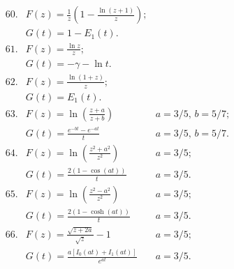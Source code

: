 \documentclass[10pt]{article}
\begin{document}
\[
\begin{array}{llr}
60. & F(z)= \frac{1}{z}\left (1-\frac{\ln (z+1)}{z}\right );& \\[1cm]
  & G(t)= 1- E_1(t).&\\[1cm]
61. & F(z)= \frac{\ln z}{z};& \\[1cm]
  & G(t)= -\gamma - \ln t.&\\[1cm]
62. & F(z)= \frac{\ln (1+z)}{z};& \\[1cm]
  & G(t)= E_1(t).&\\[1cm]
63. & F(z)= \ln \left ( \frac{z+a}{z+b}\right ) &a=3/5, \, b=5/7; \\[1cm]
  & G(t)= \frac{e^{-bt}-e^{-at}}{t}&a=3/5, \, b=5/7.\\[1cm]
64. & F(z)= \ln \left ( \frac{z^{2}+a^{2}}{z^{2}}\right )&a=3/5; \\[1cm]
  & G(t)= \frac{2(1-\cos(at))}{t}&a=3/5.\\[1cm]
65. & F(z)= \ln \left (\frac{z^{2}-a^{2}}{z^{2}}\right )&a=3/5; \\[1cm]
  & G(t)= \frac{2(1-\cosh(at))}{t}&a=3/5.\\[1cm]
66. & F(z)= \frac{\sqrt{z+2a}}{\sqrt{z}}-1&a=3/5; \\[1cm]
  & G(t)= \frac{a[I_0(at)+ I_1(at)]}{e^{at}}&a=3/5.\\[1cm]
  \end{array}
\]
\end{document}
